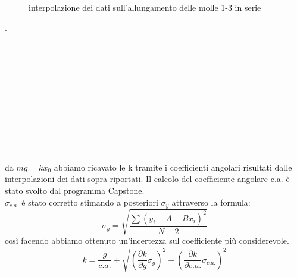 \documentclass[a4paper]{article}
\theoremstyle{definition}
\begin{document}
\begin{figure}[!htbp]
	\captionsetup{labelformat = empty}
	\caption{interpolazione dei dati sull'allungamento delle molle 1-3 in serie}
\end{figure}
.\\\\\\\\\\\\\\\\\\\\\\\\

\noindent da \(mg = kx_{0}\) abbiamo ricavato le k tramite i coefficienti angolari risultati dalle interpolazioni dei dati sopra riportati. Il calcolo del coefficiente angolare c.a. è stato svolto dal programma Capstone.\\
\(\sigma_{c.a.}\) è stato corretto stimando a posteriori \(\sigma_{y}\) attraverso la formula:
\[\sigma_{y} = \sqrt{\frac{\sum (y_{i}-A-Bx_{i})^{2}}{N-2}}\] 
così facendo abbiamo ottenuto un'incertezza sul coefficiente più considerevole.
\[k = \frac{g}{c.a.} \pm \sqrt{\left ( \frac{\partial k}{\partial g} \sigma _{g}\right )^{2} + \left ( \frac{\partial k}{\partial c.a.}\sigma _{c.a.} \right )^{2}}\]
\end{document}

